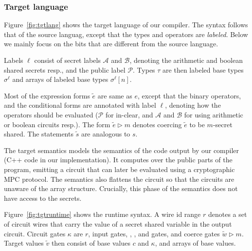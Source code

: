 \subsubsection*{Target language} Figure~\ref{fig:tgtlang} shows the
target language of our compiler. The syntax follows that of the source
languag, except that the types and operators are \emph{labeled}. Below
we mainly focus on the bits that are different from the source
language.

Labels $\ell$ consist of secret labels $\mathcal{A}$ and
$\mathcal{B}$, denoting the arithmetic and boolean shared secrets
resp., and the public label $\mathcal{P}$. Types $\tau$ are then
labeled base types $\sigma^{\ell}$ and arrays of labeled base types
$\sigma^{\ell}[n]$.

Most of the expression forms $\widetilde{e}$ are same as $e$, except
that the binary operators, and the conditional forms
are annotated with label $\ell$, denoting how the operators should be
evaluated ($\mathcal{P}$ for in-clear, and $\mathcal{A}$ and
$\mathcal{B}$ for using arithmetic or boolean circuits resp.). The
form $\widetilde{e} \rhd m$ denotes coercing $\widetilde{e}$ to be
$m$-secret shared. The statements $\widetilde{s}$ are analogous to
$s$.

The target semantics models the semantics of the code output by
our compiler (C++ code in our implementation). It computes over the
public parts of the program, emitting a circuit that can later be
evaluated using a cryptographic MPC protocol. The semantics also
flattens the circuit so that the circuits are unaware of the array
structure. Crucially, this phase of the semantics does not have access
to the secrets.

Figure~\ref{fig:tgtruntime} shows the runtime syntax. A wire id range
$r$ denotes a set of circuit wires that carry the value of a secret
shared variable in the output circuit. Circuit gates $\kappa$ are
$r$, input gates, , , and  gates, and coerce
gates $\widetilde{w} \rhd m$. Target values $\widetilde{v}$ then
consist of base values $c$ and $\kappa$, and arrays of base values.

